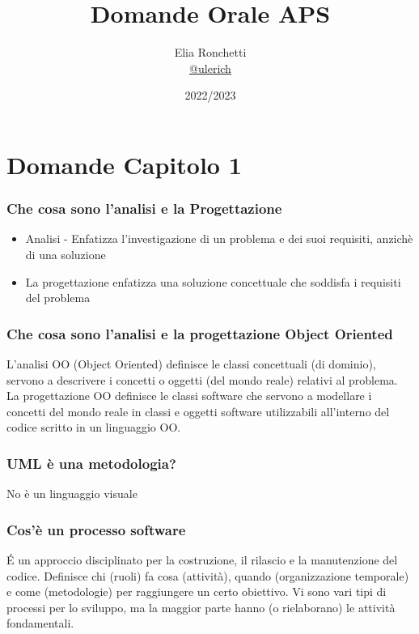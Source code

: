 \documentclass[12pt, a4paper, openany]{book}
\begin{document}
\title{Domande Orale APS}

\author{
    Elia Ronchetti\\
	\small{\href{https://t.me/ulerich}{@ulerich}}
}

\date{2022/2023}

\maketitle

\tableofcontents

\chapter{Domande Capitolo 1}
\subsection*{Che cosa sono l'analisi e la Progettazione}
\begin{itemize}
    \item Analisi - Enfatizza l'investigazione di un problema e dei suoi requisiti,
    anzichè di una soluzione
    \item La progettazione enfatizza una soluzione concettuale che soddisfa i
    requisiti del problema
\end{itemize}

\subsection*{Che cosa sono l'analisi e la progettazione Object Oriented}
L'analisi OO (Object Oriented) definisce le classi concettuali (di dominio), servono a descrivere i concetti
o oggetti (del mondo reale) relativi al problema.\\
La progettazione OO definisce le classi software che servono a modellare i concetti del
mondo reale in classi e oggetti software utilizzabili all'interno del codice scritto in un linguaggio
OO.

\subsection*{UML è una metodologia?}
No è un linguaggio visuale

\subsection*{Cos'è un processo software}
\'E un approccio disciplinato per la costruzione, il rilascio e la manutenzione del codice. Definisce chi (ruoli) fa cosa
(attività), quando (organizzazione temporale) e come (metodologie) per raggiungere un certo obiettivo. Vi sono
vari tipi di processi per lo sviluppo, ma la maggior parte hanno (o rielaborano) le attività fondamentali.
\end{document}
